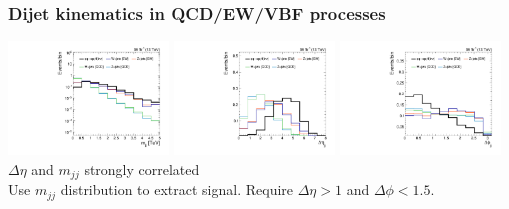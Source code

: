 \documentclass[aspectratio=169,xcolor=dvipsnames,,table,compress]{beamer}
\begin{document}
\begin{frame}   \frametitle{Dijet kinematics in QCD/EW/VBF processes}
  \centering
  \includegraphics[width=0.32\textwidth]{../figures/vbf/shapes/loosesignal_jot12Mass_logy.pdf}
  \includegraphics[width=0.32\textwidth]{../figures/vbf/shapes/loosesignal_jot12DEta.pdf}
  \includegraphics[width=0.32\textwidth]{../figures/vbf/shapes/loosesignal_jot12DPhi.pdf} \\
  $\Delta\eta$ and $m_{jj}$ strongly correlated \\ 
  Use $m_{jj}$ distribution to extract signal. Require $\Delta\eta>1$ and $\Delta\phi<1.5$. 
\end{frame}
\end{document}
